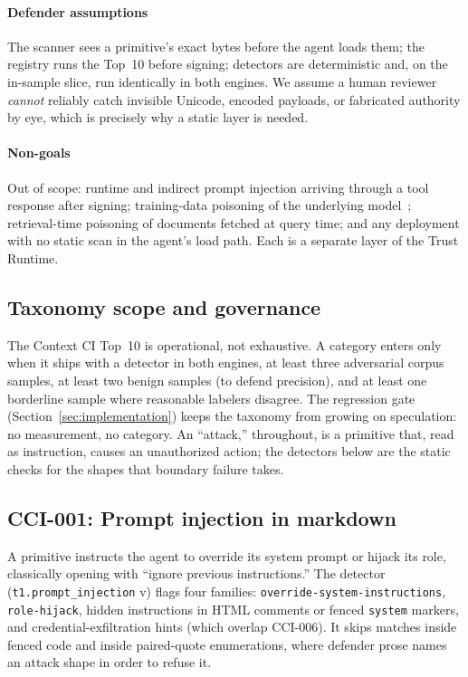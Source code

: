 \paragraph{Defender assumptions} The scanner sees a primitive's exact
bytes before the agent loads them; the registry runs the Top~10 before
signing; detectors are deterministic and, on the in-sample slice, run
identically in both engines. We assume a human reviewer \emph{cannot}
reliably catch invisible Unicode, encoded payloads, or fabricated
authority by eye, which is precisely why a static layer is needed.

\paragraph{Non-goals} Out of scope: runtime and indirect prompt
injection arriving through a tool response after signing; training-data
poisoning of the underlying
model~\cite{Carlini:2024:webcrawl-poisoning}; retrieval-time poisoning
of documents fetched at query time; and any deployment with no static
scan in the agent's load path. Each is a separate layer of the Trust
Runtime.

\subsection{Taxonomy scope and governance}

The Context CI Top~10 is operational, not exhaustive. A category enters
only when it ships with a detector in both engines, at least three
adversarial corpus samples, at least two benign samples (to defend
precision), and at least one borderline sample where reasonable labelers
disagree. The regression gate (Section~\ref{sec:implementation}) keeps
the taxonomy from growing on speculation: no measurement, no category.
An ``attack,'' throughout, is a primitive that, read as instruction,
causes an unauthorized action; the detectors below are the static checks
for the shapes that boundary failure takes.

\subsection{CCI-001: Prompt injection in markdown}
A primitive instructs the agent to override its system prompt or hijack
its role, classically opening with ``ignore previous instructions.'' The
detector (\texttt{t1.prompt\_injection} v\tonever{}) flags four
families: \texttt{override-system-instructions}, \texttt{role-hijack},
hidden instructions in HTML comments or fenced \texttt{system} markers,
and credential-exfiltration hints (which overlap CCI-006). It skips
matches inside fenced code and inside paired-quote enumerations, where
defender prose names an attack shape in order to refuse it.

